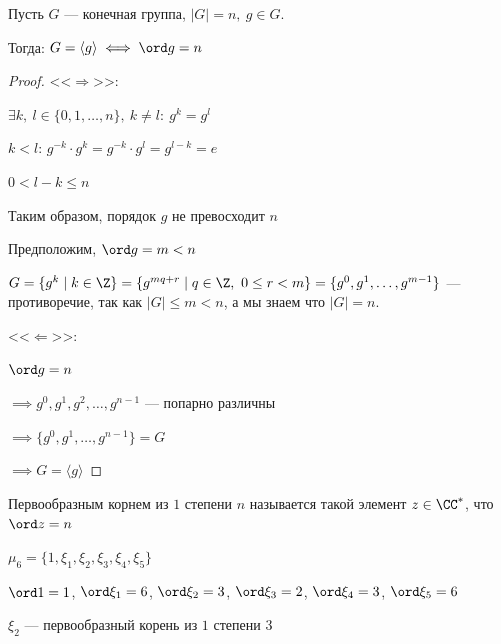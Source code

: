 \begin{theorem-non}
    Пусть $G$ --- конечная группа, $|G| = n,~g \in G$.

    Тогда: $G = \langle g \rangle \iff \ord g = n$
\end{theorem-non}

\begin{proof}

    <<$\Rightarrow$>>:

    $\exists k,~l \in \{0, 1, \ldots, n\},~k \neq l:\ g^k = g^l$

    $k < l$: $g^{-k} \cdot g^k = g^{-k} \cdot g^l = g^{l - k} = e$

    $0 < l - k \leq n$

    Таким образом, порядок $g$ не превосходит $n$

    Предположим, $\ord g = m < n$

    $G = \{ g^k \mid k \in \Z \} = \{ g^{mq + r} \mid q \in \Z,~0 \leq r < m \} = \{g^0, g^1, \ldots, g^{m-1}\}$ --- противоречие, так как $|G| \leq m < n$, а мы знаем что $|G| = n$.

    <<$\Leftarrow$>>:

    $\ord g = n$

    $\implies g^0, g^1, g^2, \ldots, g^{n - 1}$ --- попарно различны

    $\implies \{g^0, g^1, \ldots, g^{n - 1}\} = G$

    $\implies G = \langle g \rangle$
\end{proof}

\begin{defn}
    Первообразным корнем из $1$ степени $n$ называется такой элемент $z \in \CC^*$, что $\ord z = n$
\end{defn}

\begin{example}
    $\mu_6 = \{1, \xi_1, \xi_2, \xi_3, \xi_4, \xi_5\}$
    
    $\ord 1 = 1$, $\ord \xi_1 = 6$, $\ord \xi_2 = 3$, $\ord \xi_3 = 2$, $\ord \xi_4 = 3$, $\ord \xi_5 = 6$

    $\xi_2$ --- первообразный корень из $1$ степени $3$
\end{example}